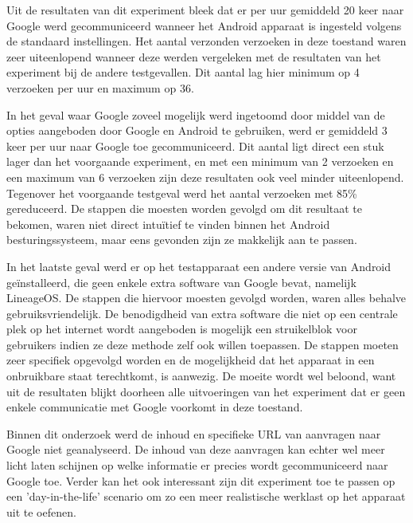Uit de resultaten van dit experiment bleek dat er per uur gemiddeld 20 keer naar Google werd gecommuniceerd wanneer het Android apparaat is ingesteld volgens de standaard instellingen. Het aantal verzonden verzoeken in deze toestand waren zeer uiteenlopend wanneer deze werden vergeleken met de resultaten van het experiment bij de andere testgevallen. Dit aantal lag hier minimum op 4 verzoeken per uur en maximum op 36.

In het geval waar Google zoveel mogelijk werd ingetoomd door middel van de opties aangeboden door Google en Android te gebruiken, werd er gemiddeld 3 keer per uur naar Google toe gecommuniceerd. Dit aantal ligt direct een stuk lager dan het voorgaande experiment, en met een minimum van 2 verzoeken en een maximum van 6 verzoeken zijn deze resultaten ook veel minder uiteenlopend. Tegenover het voorgaande testgeval werd het aantal verzoeken met 85\% gereduceerd. De stappen die moesten worden gevolgd om dit resultaat te bekomen, waren niet direct intuïtief te vinden binnen het Android besturingssysteem, maar eens gevonden zijn ze makkelijk aan te passen.

In het laatste geval werd er op het testapparaat een andere versie van Android geïnstalleerd, die geen enkele extra software van Google bevat, namelijk LineageOS. De stappen die hiervoor moesten gevolgd worden, waren alles behalve gebruiksvriendelijk. De benodigdheid van extra software die niet op een centrale plek op het internet wordt aangeboden is mogelijk een struikelblok voor gebruikers indien ze deze methode zelf ook willen toepassen. De stappen moeten zeer specifiek opgevolgd worden en de mogelijkheid dat het apparaat in een onbruikbare staat terechtkomt, is aanwezig. De moeite wordt wel beloond, want uit de resultaten blijkt doorheen alle uitvoeringen van het experiment dat er geen enkele communicatie met Google voorkomt in deze toestand.

Binnen dit onderzoek werd de inhoud en specifieke URL van aanvragen naar Google niet geanalyseerd. De inhoud van deze aanvragen kan echter wel meer licht laten schijnen op welke informatie er precies wordt gecommuniceerd naar Google toe. Verder kan het ook interessant zijn dit experiment toe te passen op een 'day-in-the-life' scenario om zo een meer realistische werklast op het apparaat uit te oefenen.
